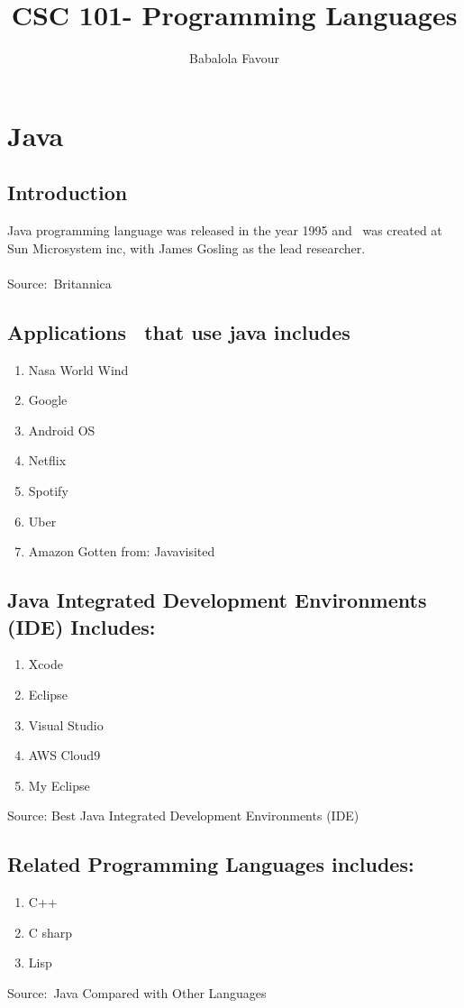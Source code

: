 \documentclass{article}
\begin{document}
	\title{CSC 101- Programming Languages}
	\author{Babalola Favour}
	\maketitle
	\tableofcontents
	\section{Java}
	\subsection{Introduction}
	Java programming language was released in the year 1995 and  was created at Sun Microsystem inc, with James Gosling as the lead researcher. 
	\paragraph{}Source: Britannica
	
	\subsection{Applications  that use java includes}
	\begin{enumerate}
		\item Nasa World Wind
		\item Google
		\item Android OS
		\item Netflix
		\item Spotify
		\item Uber
		\item Amazon
		Gotten from: Javavisited
	\end{enumerate}
	\subsection {Java Integrated Development Environments (IDE) Includes:}
	\begin{enumerate}
		\item Xcode
		\item Eclipse
		\item Visual Studio
		\item AWS Cloud9
		\item My Eclipse
	\end{enumerate}
	Source: Best Java Integrated Development Environments (IDE)
	\subsection{Related Programming Languages includes:}
	\begin{enumerate}
		\item C++
		\item C sharp
		\item Lisp
	\end{enumerate}
	Source: Java Compared with Other Languages
\end{document}
